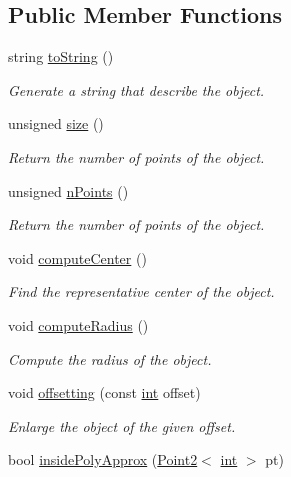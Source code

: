 \subsection*{Public Member Functions}
\begin{DoxyCompactItemize}
\item 
string \mbox{\hyperlink{class_object_acf6d17366700fe12cafd6269561fad69}{to\+String}} ()
\begin{DoxyCompactList}\small\item\em Generate a string that describe the object. \end{DoxyCompactList}\item 
unsigned \mbox{\hyperlink{class_object_aa3744105f4a391f66ffb522df079b3c9}{size}} ()
\begin{DoxyCompactList}\small\item\em Return the number of points of the object. \end{DoxyCompactList}\item 
unsigned \mbox{\hyperlink{class_object_ae4bc2b4ca7923f4f894c4b12979ee56f}{n\+Points}} ()
\begin{DoxyCompactList}\small\item\em Return the number of points of the object. \end{DoxyCompactList}\item 
void \mbox{\hyperlink{class_object_afc241f20b0055c8840f849d40d108359}{compute\+Center}} ()
\begin{DoxyCompactList}\small\item\em Find the representative center of the object. \end{DoxyCompactList}\item 
void \mbox{\hyperlink{class_object_a520dcca66f8a8075559b3a45a7a2d81a}{compute\+Radius}} ()
\begin{DoxyCompactList}\small\item\em Compute the radius of the object. \end{DoxyCompactList}\item 
void \mbox{\hyperlink{class_object_a9cee85749dbecb460a9449b8e6bb674d}{offsetting}} (const \mbox{\hyperlink{draw_8hh_aa620a13339ac3a1177c86edc549fda9b}{int}} offset)
\begin{DoxyCompactList}\small\item\em Enlarge the object of the given offset. \end{DoxyCompactList}\item 
bool \mbox{\hyperlink{class_object_a5dd7d9cd5bd29176b04ab10d7577fc56}{inside\+Poly\+Approx}} (\mbox{\hyperlink{class_point2}{Point2}}$<$ \mbox{\hyperlink{draw_8hh_aa620a13339ac3a1177c86edc549fda9b}{int}} $>$ pt)

\end{DoxyCompactItemize}
